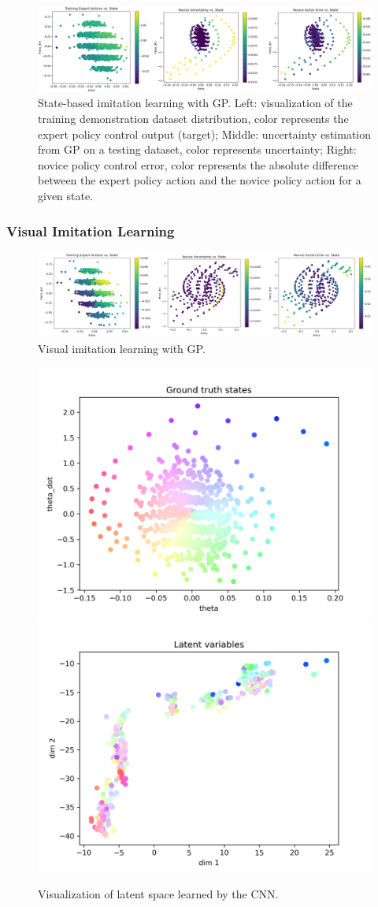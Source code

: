 \documentclass[11pt, reqno, letterpaper, twoside]{amsart}
\begin{document}
\begin{figure}[ht]
	\centering
	\includegraphics[width=\linewidth]{imgs/state-il.png}
	\caption{State-based imitation learning with GP. Left: visualization of the training demonstration dataset distribution, color represents the expert policy control output (target); Middle: uncertainty estimation from GP on a testing dataset, color represents uncertainty; Right: novice policy control error, color represents the absolute difference between the expert policy action and the novice policy action for a given state.}
	\label{fig:state-il}
\end{figure}

\subsubsection{Visual Imitation Learning}

\begin{figure}[ht]
	\centering
	\includegraphics[width=\linewidth]{imgs/visual-il.png}
	\caption{Visual imitation learning with GP.}
	\label{fig:visual-il}
\end{figure}

\begin{figure}[ht]
	\centering
	\includegraphics[width=0.4\linewidth]{imgs/latentVis_gt_states_0.png}
	\includegraphics[width=0.4\linewidth]{imgs/latentVis_latents_0.png}
	\caption{Visualization of latent space learned by the CNN.}
	\label{fig:latent}
\end{figure}
\end{document}
